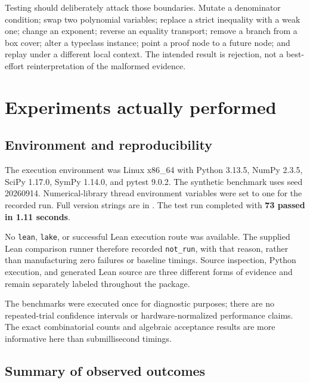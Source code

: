 \documentclass[11pt,a4paper]{article}
\newcommand{\code}[1]{\texttt{\small #1}}
\begin{document}
Testing should deliberately attack those boundaries. Mutate a denominator
condition; swap two polynomial variables; replace a strict inequality with a
weak one; change an exponent; reverse an equality transport; remove a branch
from a box cover; alter a typeclass instance; point a proof node to a future
node; and replay under a different local context. The intended result is
rejection, not a best-effort reinterpretation of the malformed evidence.


\section{Experiments actually performed}

\subsection{Environment and reproducibility}

The execution environment was Linux x86\_64 with Python 3.13.5, NumPy 2.3.5,
SciPy 1.17.0, SymPy 1.14.0, and pytest 9.0.2. The synthetic benchmark uses seed
20260914. Numerical-library thread environment variables were set to one for
the recorded run. Full version strings are in .
The test run completed with \textbf{73 passed in 1.11 seconds}.

No \code{lean}, \code{lake}, or successful Lean execution route was available.
The supplied Lean comparison runner therefore recorded \code{not\_run}, with
that reason, rather than manufacturing zero failures or baseline timings.
Source inspection, Python execution, and generated Lean source are three
different forms of evidence and remain separately labeled throughout the
package.

The benchmarks were executed once for diagnostic purposes; there are no
repeated-trial confidence intervals or hardware-normalized performance claims.
The exact combinatorial counts and algebraic acceptance results are more
informative here than submillisecond timings.

\subsection{Summary of observed outcomes}
\end{document}
